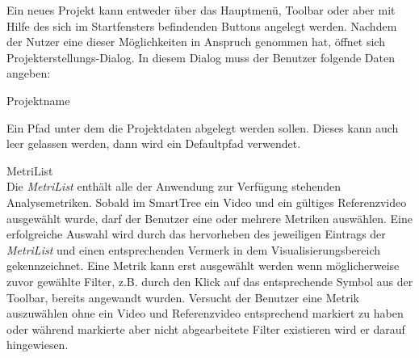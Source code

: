 Ein neues Projekt kann entweder über das Hauptmenü, Toolbar oder aber mit Hilfe des sich
im Startfensters befindenden Buttons angelegt werden. Nachdem der Nutzer eine dieser Möglichkeiten
in Anspruch genommen hat, öffnet sich Projekterstellungs-Dialog. In diesem Dialog
muss der Benutzer folgende Daten angeben:
\begin{compactitem}
\item Projektname
\item Ein Pfad unter dem die Projektdaten abgelegt werden sollen. Dieses kann auch leer gelassen werden, 
dann wird ein Defaultpfad verwendet.
\end{compactitem}

%

 MetriList\\
Die \emph{MetriList} enthält alle der Anwendung zur Verfügung stehenden Analysemetriken.
Sobald im SmartTree ein Video und ein gültiges Referenzvideo ausgewählt wurde, darf der Benutzer
eine oder mehrere Metriken auswählen. Eine erfolgreiche Auswahl wird durch das hervorheben des
jeweiligen Eintrags der \emph{MetriList} und einen entsprechenden Vermerk in dem Visualisierungsbereich
gekennzeichnet. Eine Metrik kann erst ausgewählt werden wenn möglicherweise zuvor gewählte Filter,
z.B. durch den Klick auf das entsprechende Symbol aus der Toolbar, bereits angewandt wurden. Versucht
der Benutzer eine Metrik auszuwählen ohne ein Video und Referenzvideo entsprechend markiert zu haben oder
während markierte aber nicht abgearbeitete Filter existieren wird er darauf hingewiesen.

